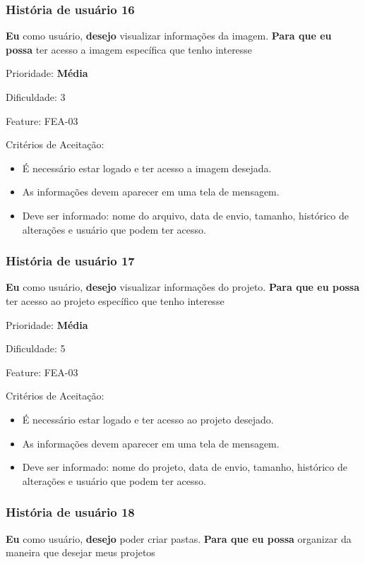   \subsubsection{História de usuário 16}
    \textbf{Eu} como usuário, \textbf{desejo} visualizar informações da imagem. \textbf{Para que eu possa} ter acesso a imagem específica que tenho interesse

    Prioridade: \textbf{Média}

    Dificuldade: 3

    Feature: FEA-03

    Critérios de Aceitação:
    \begin{itemize}
      \item É necessário estar logado e ter acesso a imagem desejada.
      \item As informações devem aparecer em uma tela de mensagem. 
      \item Deve ser informado: nome do arquivo, data de envio, tamanho, histórico de alterações e usuário que podem ter acesso. 
    \end{itemize}

  \subsubsection{História de usuário 17}
    \textbf{Eu} como usuário, \textbf{desejo} visualizar informações do projeto. \textbf{Para que eu possa} ter acesso ao projeto específico que tenho interesse

    Prioridade: \textbf{Média}

    Dificuldade: 5

    Feature: FEA-03

    Critérios de Aceitação:
    \begin{itemize}
      \item É necessário estar logado e ter acesso ao projeto desejado.
      \item As informações devem aparecer em uma tela de mensagem. 
      \item Deve ser informado: nome do projeto, data de envio, tamanho, histórico de alterações e usuário que podem ter acesso.
    \end{itemize}

  \subsubsection{História de usuário 18}
    \textbf{Eu} como usuário, \textbf{desejo} poder criar pastas. \textbf{Para que eu possa} organizar da maneira que desejar meus projetos

